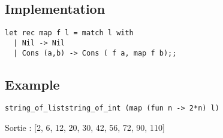 \documentclass[12pt,french]{article}
\begin{document}
\subsection{Implementation}

\begin{verbatim}
let rec map f l = match l with
  | Nil -> Nil
  | Cons (a,b) -> Cons ( f a, map f b);;
\end{verbatim}
\subsection{Example}
\begin{verbatim}
string_of_liststring_of_int (map (fun n -> 2*n) l)
\end{verbatim}
Sortie :
[2, 6, 12, 20, 30, 42, 56, 72, 90, 110]
\end{document}

